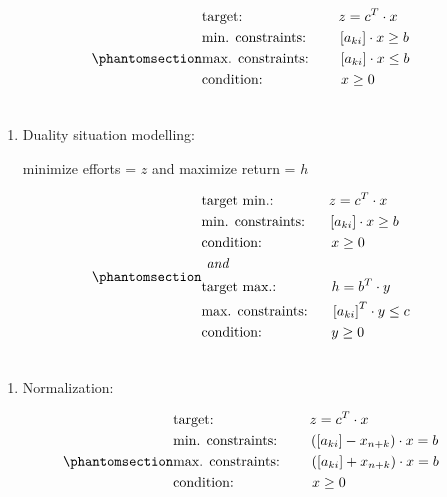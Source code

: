 \documentclass[
  letterpaper,
  DIV=11,
  numbers=noendperiod]{scrartcl}
\providecommand{\tightlist}{%
  \setlength{\itemsep}{0pt}\setlength{\parskip}{0pt}}
\begin{document}
\begin{equation}\phantomsection\label{eq-situationopt}{\begin{split} &
\text{target:}            \hphantom{min.nstraints:}     z = c^T \cdot x \\&
\text{min. constraints:}  \hphantom{max.}               \left[ a_{ki} \right] \cdot x \ge b   \\&
\text{max. constraints:}  \hphantom{min.}               \left[ a_{ki} \right] \cdot x \le b   \\&
\text{condition:}         \hphantom{max.raints:}        x \ge 0   \\&
\end{split}}\end{equation}

\begin{enumerate}
\def\labelenumi{\arabic{enumi}.}
\setcounter{enumi}{1}
\item
  Duality situation modelling:

  minimize efforts = \(z\) and maximize return = \(h\)
\end{enumerate}

\begin{equation}\phantomsection\label{eq-situationdual}{\begin{split} &
\text{target min.:}         \hphantom{ andints:}      z = c^T \cdot x     \\&
\text{min. constraints:}    \hphantom{ and}           \left[ a_{ki} \right] \cdot x \ge b   \\&
\text{condition:}           \hphantom{ andraints:}    x \ge 0       \\&
\textit{ and}    \\&
\text{target max.:}         \hphantom{ andints:}      h = b^T \cdot y \\&
\text{max. constraints:}    \hphantom{ and}           \left[ a_{ki} \right]^T \cdot y \le c   \\&
\text{condition:}           \hphantom{ andraints:}    y \ge 0         \\&
\end{split}}\end{equation}

\begin{enumerate}
\def\labelenumi{\arabic{enumi}.}
\setcounter{enumi}{2}
\tightlist
\item
  Normalization:
\end{enumerate}

\begin{equation}\phantomsection\label{eq-optnorm}{\begin{split} &
\text{target:}              \hphantom{min.nstraints:}      z = c^T \cdot x \\&
\text{min. constraints:}    \hphantom{max.}    \left( \left[ a_{ki} \right] - x_{n+k} \right) \cdot x = b   \\&
\text{max. constraints:}    \hphantom{min.}    \left( \left[ a_{ki} \right] + x_{n+k} \right) \cdot x = b   \\&
\text{condition:}           \hphantom{max.raints:}    x \ge 0       \\&
\end{split}}\end{equation}
\end{document}
